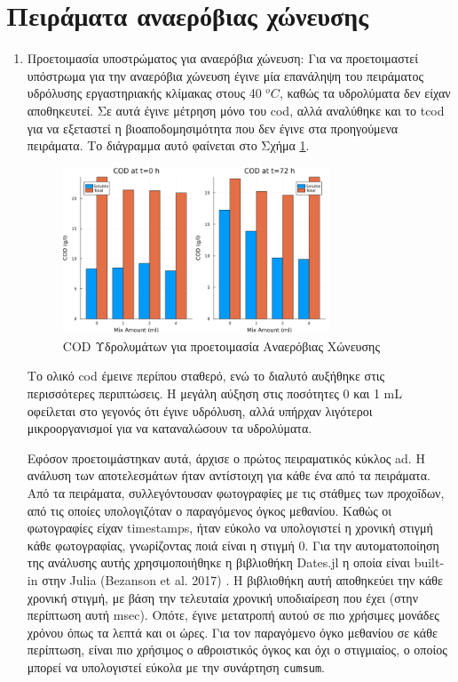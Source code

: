\documentclass[11pt]{report}
\makeatletter
\newcommand{\citeprocitem}[2]{\hyper@linkstart{cite}{citeproc_bib_item_#1}#2\hyper@linkend}
\makeatother
\begin{document}
\section{Πειράματα αναερόβιας χώνευσης}
\label{sec:org9dccbfe}
\begin{enumerate}
\item Προετοιμασία υποστρώματος για αναερόβια χώνευση:
\label{sec:org501985f}
Για να προετοιμαστεί υπόστρωμα για την αναερόβια χώνευση έγινε μία επανάληψη του πειράματος υδρόλυσης εργαστηριακής κλίμακας στους 40 \(^oC\), καθώς τα υδρολύματα δεν είχαν αποθηκευτεί. Σε αυτά έγινε μέτρηση μόνο του \acrshort{cod}, αλλά αναλύθηκε και το \acrfull{tcod} για να εξεταστεί η βιοαποδομησιμότητα που δεν έγινε στα προηγούμενα πειράματα. Το διάγραμμα αυτό φαίνεται στο Σχήμα \ref{fig:org7b3725d}.

\begin{figure}[htbp]
\centering
\includegraphics[width=300px]{../plots/26_03/complete_cod_bar_26_03.png}
\caption{\label{fig:org7b3725d}COD Υδρολυμάτων για προετοιμασία Αναερόβιας Χώνευσης}
\end{figure}

Το ολικό \acrshort{cod} έμεινε περίπου σταθερό, ενώ το διαλυτό αυξήθηκε στις περισσότερες περιπτώσεις. Η μεγάλη αύξηση στις ποσότητες 0 και 1 mL οφείλεται στο γεγονός ότι έγινε υδρόλυση, αλλά υπήρχαν λιγότεροι μικροοργανισμοί για να καταναλώσουν τα υδρολύματα.

Εφόσον προετοιμάστηκαν αυτά, άρχισε ο πρώτος πειραματικός κύκλος \acrshort{ad}. Η ανάλυση των αποτελεσμάτων ήταν αντίστοιχη για κάθε ένα από τα πειράματα. Από τα πειράματα, συλλεγόντουσαν φωτογραφίες με τις στάθμες των προχοΐδων, από τις οποίες υπολογιζόταν ο παραγόμενος όγκος μεθανίου. Καθώς οι φωτογραφίες είχαν timestamps, ήταν εύκολο να υπολογιστεί η χρονική στιγμή κάθε φωτογραφίας, γνωρίζοντας ποιά είναι η στιγμή 0. Για την αυτοματοποίηση της ανάλυσης αυτής χρησιμοποιήθηκε η βιβλιοθήκη Dates.jl η οποία είναι built-in στην Julia (\citeprocitem{6}{Bezanson et al. 2017}) . Η βιβλιοθήκη αυτή αποθηκεύει την κάθε χρονική στιγμή, με βάση την τελευταία χρονική υποδιαίρεση που έχει (στην περίπτωση αυτή msec). Οπότε, έγινε μετατροπή αυτού σε πιο χρήσιμες μονάδες χρόνου όπως τα λεπτά και οι ώρες. Για τον παραγόμενο όγκο μεθανίου σε κάθε περίπτωση, είναι πιο χρήσιμος ο αθροιστικός όγκος και όχι ο στιγμιαίος, ο οποίος μπορεί να υπολογιστεί εύκολα με την συνάρτηση \texttt{cumsum}.


\end{enumerate}
\end{document}
